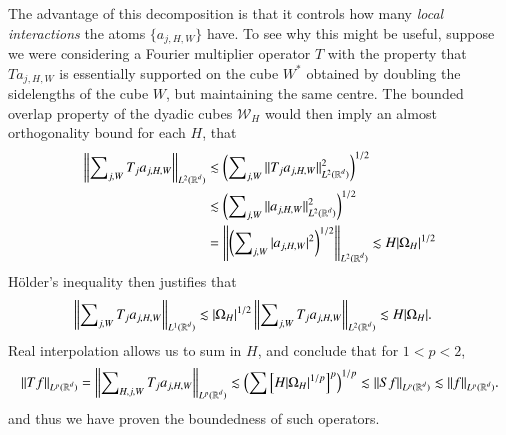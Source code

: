 The advantage of this decomposition is that it controls how many \emph{local interactions} the atoms $\{ a_{j,H,W} \}$ have. To see why this might be useful, suppose we were considering a Fourier multiplier operator $T$ with the property that $T a_{j,H,W}$ is essentially supported on the cube $W^*$ obtained by doubling the sidelengths of the cube $W$, but maintaining the same centre. The bounded overlap property of the dyadic cubes $\mathcal{W}_H$ would then imply an almost orthogonality bound for each $H$, that
%
\begin{align*}
  \left\| \sum\nolimits_{j,W} T_j a_{j,H,W} \right\|_{L^2(\operatorname{\mathbb{R}}^d)} &\lesssim \left( \sum\nolimits_{j,W} \| T_j a_{j,H,W} \|_{L^2(\operatorname{\mathbb{R}}^d)}^2 \right)^{1/2}\\
  &\lesssim \left( \sum\nolimits_{j,W} \| a_{j,H,W} \|_{L^2(\operatorname{\mathbb{R}}^d)}^2 \right)^{1/2}\\
  &= \left\| \left( \sum\nolimits_{j,W} |a_{j,H,W}|^2 \right)^{1/2} \right\|_{L^2(\operatorname{\mathbb{R}}^d)} \lesssim H |\Omega_H|^{1/2}
\end{align*}
%
%
%
H\"{o}lder's inequality then justifies that
%
\begin{align*}
  \left\| \sum\nolimits_{j,W} T_j a_{j,H,W} \right\|_{L^1(\operatorname{\mathbb{R}}^d)} &\lesssim |\Omega_H|^{1/2} \left\| \sum\nolimits_{j,W} T_j a_{j,H,W} \right\|_{L^2(\operatorname{\mathbb{R}}^d)} \lesssim H |\Omega_H|.
\end{align*}
%
Real interpolation allows us to sum in $H$, and conclude that for $1 < p < 2$,
%
\[ \| Tf \|_{L^p(\operatorname{\mathbb{R}}^d)} = \left\| \sum\nolimits_{H,j,W} T_j a_{j,H,W} \right\|_{L^p(\operatorname{\mathbb{R}}^d)} \lesssim \left( \sum \left[ H |\Omega_H|^{1/p} \right]^p \right)^{1/p} \lesssim \| S f \|_{L^p(\operatorname{\mathbb{R}}^d)} \lesssim \| f \|_{L^p(\operatorname{\mathbb{R}}^d)}. \]
%
and thus we have proven the boundedness of such operators.

